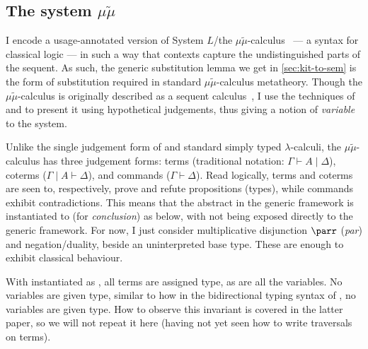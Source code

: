 \subsection{The system $\mu\tilde\mu$}\label{sec:mu-mu-tilde}
I encode a usage-annotated version of System $L$/the
$\mu\tilde\mu$-calculus~\citep{CH00} --- a syntax for classical logic --- in
such a way that contexts capture the undistinguished parts of the sequent.
As such, the generic substitution lemma we get in \cref{sec:kit-to-sem} is the
form of substitution required in standard $\mu\tilde\mu$-calculus metatheory.
Though the $\mu\tilde\mu$-calculus is originally described as a sequent
calculus~\citep{CH00}, I use the techniques of
\citet[p.~12]{herbelin-hab} and \citet{LC06} to present it using hypothetical
judgements, thus giving a notion of \emph{variable} to the system.

Unlike the single judgement form of \name{} and standard simply typed
$\lambda$-calculi, the $\mu\tilde\mu$-calculus has three judgement forms:
terms (traditional notation: $\Gamma \vdash A \mid \Delta$), coterms
($\Gamma \mid A \vdash \Delta$), and commands ($\Gamma \vdash \Delta$).
Read logically, terms and coterms are seen to, respectively, prove and refute
propositions (types), while commands exhibit contradictions.
This means that the abstract  in the generic framework is
instantiated to  (for \emph{conclusion}) as below, with
 not being exposed directly to the generic framework.
For now, I just consider multiplicative disjunction $\parr$ (\emph{par}) and
negation/duality, beside an uninterpreted base type.
These are enough to exhibit classical behaviour.

\noindent
\begin{minipage}[t]{0.5\textwidth}
\end{minipage}
\begin{minipage}[t]{0.5\textwidth}
\end{minipage}

With  instantiated as , all terms are assigned
 type, as are all the variables.
No variables are given  type, similar to how in
the bidirectional typing syntax of \citet[p.~25]{AACMM21}, no variables are
given  type.
How to observe this invariant is covered in the latter paper, so we will not
repeat it here (having not yet seen how to write traversals on terms).

